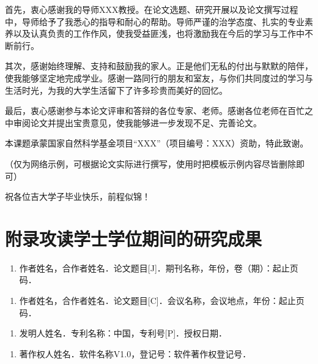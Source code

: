 \documentclass[12pt, a4paper, fontset=fandol]{ctexart}
\numberwithin{equation}{section}
\begin{document}
首先，衷心感谢我的导师XXX教授。在论文选题、研究开展以及论文撰写过程中，导师给予了我悉心的指导和耐心的帮助。导师严谨的治学态度、扎实的专业素养以及认真负责的工作作风，使我受益匪浅，也将激励我在今后的学习与工作中不断前行。

其次，感谢始终理解、支持和鼓励我的家人。正是他们无私的付出与默默的陪伴，使我能够坚定地完成学业。感谢一路同行的朋友和室友，与你们共同度过的学习与生活时光，为我的大学生活留下了许多珍贵而美好的回忆。

最后，衷心感谢参与本论文评审和答辩的各位专家、老师。感谢各位老师在百忙之中审阅论文并提出宝贵意见，使我能够进一步发现不足、完善论文。

本课题承蒙国家自然科学基金项目“XXX”（项目编号：XXX）资助，特此致谢。

\noindent（仅为网络示例，可根据论文实际进行撰写，使用时把模板示例内容尽皆删除即可）

祝各位吉大学子毕业快乐，前程似锦！


\clearpage
\vspace*{-23pt}
\section*{附录\hspace{1em}攻读学士学位期间的研究成果}
{}

\begin{enumerate}[label={（\arabic*）},leftmargin=2em,labelsep=.5em,itemsep=.10\baselineskip]
    \item 作者姓名，合作者姓名．论文题目[J]．期刊名称，年份，卷（期）：起止页码．
\end{enumerate}

\begin{enumerate}[label={（\arabic*）},leftmargin=2em,labelsep=.5em,itemsep=.10\baselineskip]
    \item 作者姓名，合作者姓名．论文题目[C]．会议名称，会议地点，年份：起止页码．
\end{enumerate}

\begin{enumerate}[label={（\arabic*）},leftmargin=2em,labelsep=.5em,itemsep=.10\baselineskip]
    \item 发明人姓名．专利名称：中国，专利号[P]．授权日期．
\end{enumerate}

\begin{enumerate}[label={（\arabic*）},leftmargin=2em,labelsep=.5em,itemsep=.10\baselineskip]
    \item 著作权人姓名．软件名称V1.0，登记号：软件著作权登记号．
\end{enumerate}

\end{document}
